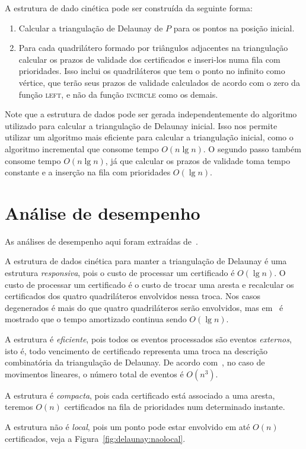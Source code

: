A estrutura de dado cinética pode ser construída da seguinte forma:
\begin{enumerate}
    \item Calcular a triangulação de Delaunay de $P$ para os pontos na posição inicial.
    \item Para cada quadrilátero formado por triângulos adjacentes na triangulação calcular os
    prazos de validade dos certificados e inseri-los numa fila com prioridades.
    Isso inclui os quadriláteros que tem o ponto no infinito como vértice, que terão seus prazos
    de validade calculados de acordo com o zero da função \textsc{left}, e não da função
    \textsc{incircle} como os demais.
\end{enumerate}

Note que a estrutura de dados pode ser gerada independentemente do algoritmo utilizado para
calcular a triangulação de Delaunay inicial.
Isso nos permite utilizar um algoritmo mais eficiente para calcular a triangulação inicial, como o
algoritmo incremental que consome tempo $O(n\lg{n})$.
O segundo passo também consome tempo $O(n\lg{n})$, já que calcular os prazos de validade toma
tempo constante e a inserção na fila com prioridades $O(\lg{n})$.


\section{Análise de desempenho}\label{sec:delaunay:analise-de-desempenho}

As análises de desempenho aqui foram extraídas de~\cite{eduardo}.

A estrutura de dados cinética para manter a triangulação de Delaunay é uma estrutura
\textit{responsiva}, pois o custo de processar um certificado é $O(\lg{n})$.
O custo de processar um certificado é o custo de trocar uma aresta e recalcular os certificados dos
quatro quadriláteros envolvidos nessa troca.
Nos casos degenerados é mais do que quatro quadriláteros serão envolvidos, mas em~\cite{citaraqui}
é mostrado que o tempo amortizado continua sendo $O(\lg{n})$.

A estrutura é \textit{eficiente}, pois todos os eventos processados são eventos \textit{externos},
isto é, todo vencimento de certificado representa uma troca na descrição combinatória da
triangulação de Delaunay.
De acordo com~\cite{eduardo}, no caso de movimentos lineares, o número total de eventos é
$O(n^3)$.

A estrutura é \textit{compacta}, pois cada certificado está associado a uma aresta, teremos
$O(n)$ certificados na fila de prioridades num determinado instante.

A estrutura não é \textit{local}, pois um ponto pode estar envolvido em até $O(n)$
certificados, veja a Figura~\ref{fig:delaunay:naolocal}.
